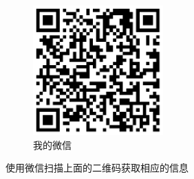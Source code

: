 \graphicspath{ {../} }

\begin{figure}[h]
  \begin{subfigure}{0.33\textwidth}
    \includegraphics[width=0.9\linewidth, height=5cm]{weixin} 
    \caption{我的微信}
    \label{fig:subim1}
  \end{subfigure}
  
  \caption{使用微信扫描上面的二维码获取相应的信息}
  \label{fig:image1}
\end{figure}